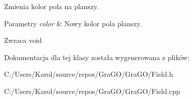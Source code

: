 Zmienia kolor pola na planszy. 


\begin{DoxyParams}{Parametry}
{\em color} & Nowy kolor pola planszy. \\
\hline
\end{DoxyParams}
\begin{DoxyReturn}{Zwraca}
void 
\end{DoxyReturn}


Dokumentacja dla tej klasy została wygenerowana z plików\+:\begin{DoxyCompactItemize}
\item 
C\+:/\+Users/\+Karol/source/repos/\+Gra\+G\+O/\+Gra\+G\+O/Field.\+h\item 
C\+:/\+Users/\+Karol/source/repos/\+Gra\+G\+O/\+Gra\+G\+O/Field.\+cpp\end{DoxyCompactItemize}
